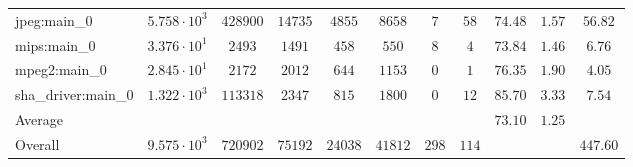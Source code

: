 \begin{tabular}{|l|c|c|c|c|c|c|c|c|c|c|}
jpeg:main\_0            & $ 5.758 \cdot 10^{3} $ & $ 428900 $ & $ 14735 $ & $ 4855  $ & $ 8658  $ & $ 7   $ & $ 58  $ & $ 74.48       $ & $ 1.57    $ & $ 56.82   $ \\
mips:main\_0            & $ 3.376 \cdot 10^{1} $ & $ 2493   $ & $ 1491  $ & $ 458   $ & $ 550   $ & $ 8   $ & $ 4   $ & $ 73.84       $ & $ 1.46    $ & $ 6.76    $ \\
mpeg2:main\_0           & $ 2.845 \cdot 10^{1} $ & $ 2172   $ & $ 2012  $ & $ 644   $ & $ 1153  $ & $ 0   $ & $ 1   $ & $ 76.35       $ & $ 1.90    $ & $ 4.05    $ \\
sha\_driver:main\_0     & $ 1.322 \cdot 10^{3} $ & $ 113318 $ & $ 2347  $ & $ 815   $ & $ 1800  $ & $ 0   $ & $ 12  $ & $ 85.70       $ & $ 3.33    $ & $ 7.54    $ \\
\hline
Average                 & $                    $ & $        $ & $       $ & $       $ & $       $ & $     $ & $     $ & $ 73.10       $ & $ 1.25    $ & $         $ \\
\hline
Overall                 & $ 9.575 \cdot 10^{3} $ & $ 720902 $ & $ 75192 $ & $ 24038 $ & $ 41812 $ & $ 298 $ & $ 114 $ & $             $ & $         $ & $ 447.60  $ \\
\hline
\end{tabular}
